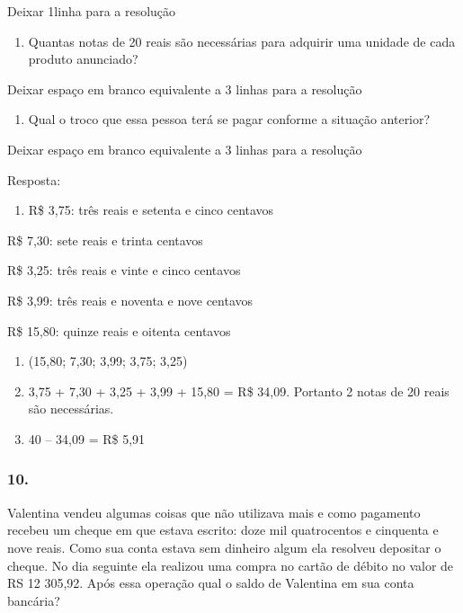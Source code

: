 Deixar 1linha para a resolução

\begin{enumerate}
\def\labelenumi{\alph{enumi})}
\item
  Quantas notas de 20 reais são necessárias para adquirir uma unidade de
  cada produto anunciado?
\end{enumerate}

Deixar espaço em branco equivalente a 3 linhas para a resolução

\begin{enumerate}
\def\labelenumi{\alph{enumi})}
\item
  Qual o troco que essa pessoa terá se pagar conforme a situação
  anterior?
\end{enumerate}

Deixar espaço em branco equivalente a 3 linhas para a resolução

Resposta:

\begin{enumerate}
\def\labelenumi{\alph{enumi})}
\item
  R\$ 3,75: três reais e setenta e cinco centavos
\end{enumerate}

R\$ 7,30: sete reais e trinta centavos

R\$ 3,25: três reais e vinte e cinco centavos

R\$ 3,99: três reais e noventa e nove centavos

R\$ 15,80: quinze reais e oitenta centavos

\begin{enumerate}
\def\labelenumi{\alph{enumi})}
\item
  (15,80; 7,30; 3,99; 3,75; 3,25)
\item
  3,75 + 7,30 + 3,25 + 3,99 + 15,80 = R\$ 34,09. Portanto 2 notas de 20
  reais são necessárias.
\item
  40 -- 34,09 = R\$ 5,91
\end{enumerate}

\subsubsection{10.}\label{section-74}

Valentina vendeu algumas coisas que não utilizava mais e como pagamento
recebeu um cheque em que estava escrito: doze mil quatrocentos e
cinquenta e nove reais. Como sua conta estava sem dinheiro algum ela
resolveu depositar o cheque. No dia seguinte ela realizou uma compra no
cartão de débito no valor de RS 12 305,92. Após essa operação qual o
saldo de Valentina em sua conta bancária?


